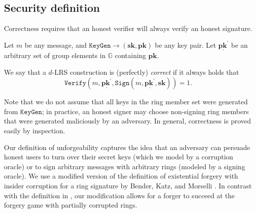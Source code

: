 \documentclass[draft]{llncs} %
\begin{document}
\subsection{Security definition}\label{sec:definitions}
Correctness requires that an honest verifier will always verify an honest signature.

\begin{definition}[Correctness]\label{def:correctness}
Let $m$ be any message, and $\texttt{KeyGen} \rightarrow (\textbf{sk},\textbf{pk})$ be any key pair. Let $\underline{\textbf{pk}^\prime}$ be an arbitrary set of group elements in $\mathbb{G}$ containing $\textbf{pk}$.

We say that a $d$-LRS construction is (perfectly) \textit{correct} if it always holds that $$\texttt{Verify}(m,\underline{\textbf{pk}^\prime},\texttt{Sign}(m,\underline{\textbf{pk}^\prime},\textbf{sk})) = 1.$$
\end{definition}
Note that we do not assume that all keys in the ring member set were generated from $\texttt{KeyGen}$; in practice, an honest signer may choose non-signing ring members that were generated maliciously by an adversary. In general, correctness is proved easily by inspection.

Our definition of unforgeability captures the idea that an adversary can persuade honest users to turn over their secret keys (which we model by a corruption oracle) or to sign arbitrary messages with arbitrary rings (modeled by a signing oracle). We use a modified version of the definition of existential forgery with insider corruption for a ring signature by Bender, Katz, and Morselli \cite{bender}. In contrast with the definition in \cite{bender}, our modification allows for a forger to succeed at the forgery game with partially corrupted rings.
\end{document}
